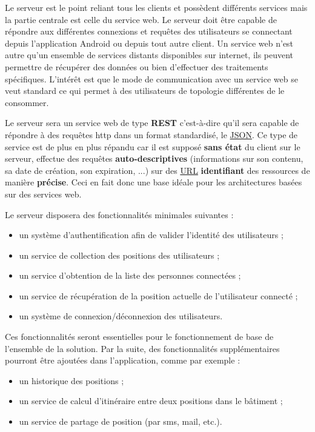 Le serveur est le point reliant tous les clients et possèdent différents services mais la partie centrale est celle du service web. Le serveur doit être capable de répondre aux différentes connexions et requêtes des utilisateurs se connectant depuis l'application Android ou depuis tout autre client. Un service web n’est autre qu’un ensemble de services distants disponibles sur internet, ils peuvent permettre de récupérer des données ou bien d’effectuer des traitements spécifiques. L’intérêt est que le mode de communication avec un service web se veut standard ce qui permet à des utilisateurs de topologie différentes de le consommer.

Le serveur sera un service web de type \textbf{REST} c’est-à-dire qu’il sera capable de répondre à des requêtes http dans un format standardisé, le \underline{JSON}. Ce type de service est de plus en plus répandu car il est supposé \textbf{sans état} du client sur le serveur, effectue des requêtes \textbf{auto-descriptives} (informations sur son contenu, sa date de création, son expiration, ...) sur des \underline{URL} \textbf{identifiant} des ressources de manière \textbf{précise}. Ceci en fait donc une base idéale pour les architectures basées sur des services web.

Le serveur disposera des fonctionnalités minimales suivantes :

\begin{itemize}
    \item un système d’authentification afin de valider l’identité des utilisateurs ;
    \item un service de collection des positions des utilisateurs ;
    \item un service d’obtention de la liste des personnes connectées ;
    \item un service de récupération de la position actuelle de l'utilisateur connecté ;
    \item un système de connexion/déconnexion des utilisateurs.
\end{itemize}

Ces fonctionnalités seront essentielles pour le fonctionnement de base de l'ensemble de la solution. Par la suite, des fonctionnalités supplémentaires pourront être ajoutées dans l'application, comme par exemple :

\begin{itemize}
    \item un historique des positions ;
    \item un service de calcul d'itinéraire entre deux positions dans le bâtiment ;
    \item un service de partage de position (par sms, mail, etc.).
\end{itemize}

